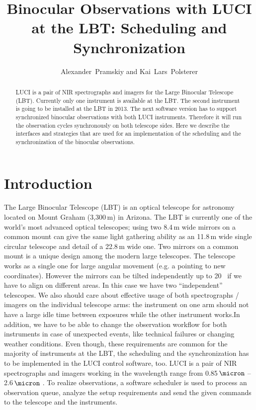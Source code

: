 
\resetcounters




\title{Binocular Observations with LUCI at the LBT: Scheduling and Synchronization}
\author{Alexander~Pramskiy and Kai~Lars~Polsterer
}


\begin{abstract}
LUCI is a pair of NIR spectrographs and imagers for the Large Binocular Telescope (LBT). Currently only one instrument is available at the LBT. The second instrument is going to be installed at the LBT in 2013. The next software version has to support synchronized binocular observations with both LUCI instruments. Therefore it will run the observation cycles synchronously on both telescope sides. Here we describe the interfaces and strategies that are used for an implementation of the scheduling and the synchronization of the binocular observations. 

\end{abstract}

\section{Introduction}

The Large Binocular Telescope (LBT) is an optical telescope for astronomy located on Mount Graham (3,300\,m) in Arizona. The LBT is currently one of the world's most advanced optical telescopes; using two 8.4\,m wide mirrors on a common mount can give the same light gathering ability as an 11.8\,m wide single circular telescope and detail of a 22.8\,m wide one. Two mirrors on a common mount is a unique design among the modern large telescopes. The telescope works as a single one for large angular movement (e.g. a pointing to new coordinates). However the mirrors can be tilted independently up to 20\arcsec~ if we have to align on different areas. In this case we have two ``independent'' telescopes. We also should care about effective usage of both spectrographs / imagers on the individual telescope arms: the instrument on one arm should not have a large idle time between exposures while the other instrument works.In addition, we have to be able to change the observation workflow for both instruments in case of unexpected events, like technical failures or changing weather conditions. Even though, these requirements are common for the majority of instruments at the LBT, the scheduling and the synchronization has to be implemented in the LUCI control software, too. LUCI is a pair of NIR spectrographs and imagers working in the wavelength range from 0.85\,$\micron$ -- 2.6\,$\micron$ \citep{2003SPIE.4841..962S,polsterer:2011}. To realize observations, a software scheduler is used to process an observation queue, analyze the setup requirements and send the given commands to the telescope and the instruments. 


